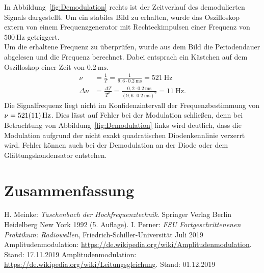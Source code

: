 \documentclass[a4paper,twoside,final]{article}
\begin{document}
In Abbildung~\ref{fig:Demodulation} rechts ist der Zeitverlauf des demodulierten Signals dargestellt. Um ein stabiles Bild zu erhalten, wurde das Oszilloskop extern von einem Frequenzgenerator mit Rechteckimpulsen einer Frequenz von $\SI{500}{\hertz}$ getriggert.\\
Um die erhaltene Frequenz zu überprüfen, wurde aus dem Bild die Periodendauer abgelesen und die Frequenz berechnet. Dabei entsprach ein Kästchen auf dem Oszilloskop einer Zeit von $\SI{0,2}{\milli\second}$.
\begin{align}
  \nu &= \frac{1}{T} = \frac{1}{9,6\cdot \SI{0,2}{\milli\second}} = \SI{521}{\hertz}\\
  \Delta \nu &= \frac{\Delta T}{T^2} = \frac{0,2\cdot \SI{0,2}{\milli\second}}{(9,6\cdot \SI{0,2}{\milli\second})^2} = \SI{11}{\hertz}.
\end{align}
Die Signalfrequenz liegt nicht im Konfidenzintervall der Frequenzbestimmung von $\nu = \SI{521\pm 11}{\hertz}$. Dies lässt auf Fehler bei der Modulation schließen, denn bei Betrachtung von Abbildung~\ref{fig:Demodulation} links wird deutlich, dass die Modulation aufgrund der nicht exakt quadratischen Diodenkennlinie verzerrt wird. Fehler können auch bei der Demodulation an der Diode oder dem Glättungskondensator entstehen.
\section{Zusammenfassung}



\begin{thebibliography}{xxx}
	H. Meinke: \textit{Taschenbuch der Hochfrequenztechnik}. Springer Verlag Berlin Heidelberg New York 1992 (5. Auflage).
  I. Perner: \textit{FSU Fortgeschrittenenen Praktikum: Radiowellen}, Fried\-rich-Schil\-ler-Uni\-versi\-tät Juli 2019
  Amplitudenmodulation: \url{https://de.wikipedia.org/wiki/Amplitudenmodulation}. Stand: 17.11.2019
  Amplitudenmodulation: \url{https://de.wikipedia.org/wiki/Leitungsgleichung}. Stand: 01.12.2019
\end{thebibliography}
\end{document}
